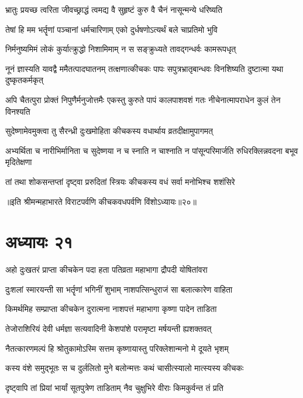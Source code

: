 \twolineshloka
{भ्रातुः प्रयच्छ त्वरिता जीवच्छ्राद्धं त्वमद्य वै}
{सुहृष्टं कुरु वै चैनं नासून्मन्ये धरिष्यति}


\twolineshloka
{तेषां हि मम भर्तॄणां पञ्चानां धर्मचारिणाम्}
{एको दुर्धषणोऽत्यर्थं बले चाप्रतिमो भुवि}


\twolineshloka
{निर्मनुष्यमिमं लोकं कुर्यात्क्रुद्धो निशामिमाम्}
{न स सङ्क्रुध्यते तावद्गन्धर्वः कामरूपधृत्}


\threelineshloka
{नूनं ज्ञास्यति यावद्वै ममैतत्पादघातनम्}
{तत्क्षणात्कीचकः पापः सपुत्रभ्रातृबान्धवः}
{विनशिष्यति दुष्टात्मा यथा दुष्कृतकर्मकृत्}


\threelineshloka
{अपि चैतत्पुरा प्रोक्तं निपुणैर्मनुजोत्तमैः}
{एकस्तु कुरुते पापं कालपाशवशं गतः}
{नीचेनात्मापराधेन कुलं तेन विनश्यति}



\twolineshloka
{सुदेष्णामेवमुक्त्वा तु सैरन्ध्री दुःखमोहिता}
{कीचकस्य वधार्थाय व्रतदीक्षामुपागमत्}


\threelineshloka
{अभ्यर्थिता च नारीभिर्मानिता च सुदेष्णया}
{न च स्नाति न चाश्नाति न पांसून्परिमार्जति}
{रुधिरक्लिन्नवदना बभूव मृदितेक्षणा}


\twolineshloka
{तां तथा शोकसन्तप्तां दृष्ट्वा प्ररुदितां स्त्रियः}
{कीचकस्य वधं सर्वा मनोभिश्च शशंसिरे}

॥इति श्रीमन्महाभारते विराटपर्वणि कीचकवधपर्वणि विंशोऽध्यायः॥२०॥

\chapter{अध्यायः २१}

\twolineshloka
{अहो दुःखतरं प्राप्ता कीचकेन पदा हता}
{पतिव्रता महाभागा द्रौपदी योषितांवरा}


\twolineshloka
{दुःशलां स्मारयन्ती सा भर्तॄणां भगिनीं शुभाम्}
{नाशपत्सिन्धुराजं सा बलात्कारेण वाहिता}


\twolineshloka
{किमर्थमिह सम्प्राप्ता कीचकेन दुरात्मना}
{नाशपत्तं महाभागा कृष्णा पादेन ताडिता}


\twolineshloka
{तेजोराशिरियं देवी धर्मज्ञा सत्यवादिनी}
{केशपांशे परामृष्टा मर्षयन्ती ह्यशक्तवत्}


\twolineshloka
{नैतत्कारणमल्पं हि श्रोतुकामोऽस्मि सत्तम}
{कृष्णायास्तु परिक्लेशान्मनो मे दूयते भृशम्}


\twolineshloka
{कस्य वंशे समुद्भूतः स च दुर्ललितो मुने}
{बलोन्मत्तः कथं चासीत्स्यालो मात्स्यस्य कीचकः}


\twolineshloka
{दृष्ट्वापि तां प्रियां भार्यां सूतपुत्रेण ताडिताम्}
{नैव चुक्षुभिरे वीराः किमकुर्वन्त तं प्रति}


